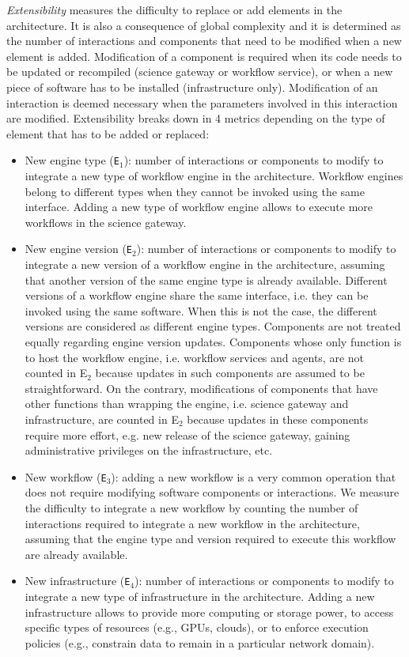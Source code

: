 \documentclass[preprint,3p,twocolumn]{elsarticle}
\newcommand{\todo}[2]{\pdfmargincomment[color=red,author=#1,open=true]{#2}}
\begin{document}
\emph{Extensibility} measures the difficulty to replace or add
elements in the architecture. It is also a consequence of global
complexity and it is determined as the number of interactions and
components that need to be modified when a new element is
added. Modification of a component is required when its code needs to
be updated or recompiled (science gateway or workflow service), or
when a new piece of software has to be installed (infrastructure
only). Modification of an interaction is deemed necessary when the
parameters involved in this interaction are modified.  Extensibility
breaks down in 4 metrics depending on the type of element that has to
be added or replaced:
\begin{itemize}[leftmargin=0cm,itemindent=0.35cm,itemsep=0cm]
\item New engine type (\texttt{E$_1$}): number of interactions or
  components to modify to integrate a new type of workflow engine in
  the architecture. Workflow engines belong to different types when
  they cannot be invoked using the same interface. Adding a new type
  of workflow engine allows to execute more workflows in the science
  gateway.
\item New engine version (\texttt{E$_2$}): number of interactions or
  components to modify to integrate a new version of a workflow engine
  in the architecture, assuming that another version of the same
  engine type is already available. Different versions of a workflow
  engine share the same interface, i.e. they can be invoked using the
  same software. When this is not the case, the different versions are
  considered as different engine types. Components are not treated
  equally regarding engine version updates. Components whose only
  function is to host the workflow engine, i.e. workflow services and
  agents, are not counted in E$_2$ because updates in such components
  are assumed to be straightforward. On the contrary, modifications of
  components that have other functions than wrapping the engine,
  i.e. science gateway and infrastructure, are counted in E$_2$
  because updates in these components require more effort, e.g. new
  release of the science gateway, gaining administrative privileges on
  the infrastructure, etc.
\item New workflow (\texttt{E$_3$}): adding a new workflow is a very
  common operation that does not require modifying software components
  or interactions. We measure the difficulty to integrate a new
  workflow by counting the number of interactions required
  to integrate a new workflow in the architecture, assuming
  that the engine type and version required to execute this workflow
  are already available.
\item New infrastructure (\texttt{E$_4$}): number of interactions or
  components to modify to integrate a new type of infrastructure in
  the architecture. Adding a new infrastructure allows to provide more
  computing or storage power, to access specific types of resources
  (e.g., GPUs, clouds), or to enforce execution policies (e.g.,
  constrain data to remain in a particular network domain).
\end{itemize}
\end{document}
